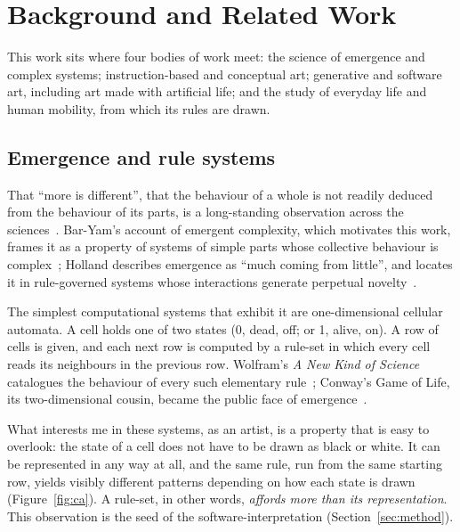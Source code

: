\section{Background and Related Work}
\label{sec:background}

This work sits where four bodies of work meet: the science of emergence and complex systems; instruction-based and conceptual art; generative and software art, including art made with artificial life; and the study of everyday life and human mobility, from which its rules are drawn.

\subsection{Emergence and rule systems}

That ``more is different'', that the behaviour of a whole is not readily deduced from the behaviour of its parts, is a long-standing observation across the sciences~\cite{anderson1972, simon1962}. Bar-Yam's account of emergent complexity, which motivates this work, frames it as a property of systems of simple parts whose collective behaviour is complex~\cite{baryam1997}; Holland describes emergence as ``much coming from little'', and locates it in rule-governed systems whose interactions generate perpetual novelty~\cite{holland1998}.

The simplest computational systems that exhibit it are one-dimensional cellular automata. A cell holds one of two states (0, dead, off; or 1, alive, on). A row of cells is given, and each next row is computed by a rule-set in which every cell reads its neighbours in the previous row. Wolfram's \emph{A New Kind of Science} catalogues the behaviour of every such elementary rule~\cite{wolfram2002}; Conway's Game of Life, its two-dimensional cousin, became the public face of emergence~\cite{gardner1970}.

What interests me in these systems, as an artist, is a property that is easy to overlook: the state of a cell does not have to be drawn as black or white. It can be represented in any way at all, and the same rule, run from the same starting row, yields visibly different patterns depending on how each state is drawn (Figure~\ref{fig:ca}). A rule-set, in other words, \emph{affords more than its representation}. This observation is the seed of the software-interpretation (Section~\ref{sec:method}).

